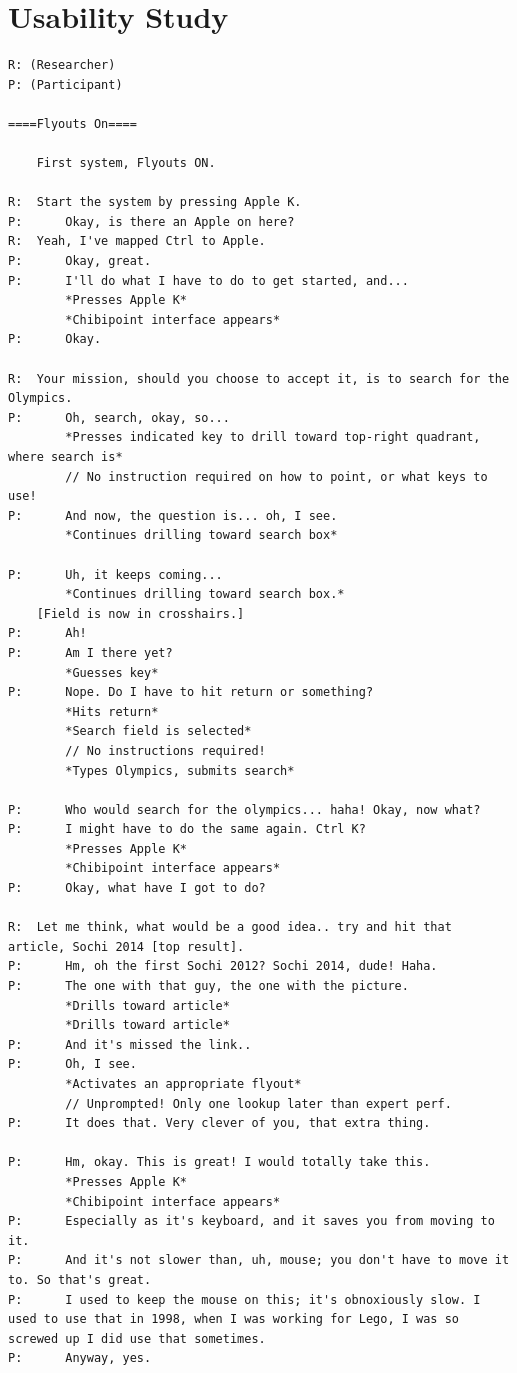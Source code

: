 \documentclass[11pt,openright,a4paper]{report}
\begin{document}
\clearpage
{}
{}
\appendix
\chapter{Usability Study}

\begin{lstlisting}[caption={Transcript of Usability Study}, label={lst:usabilityTrans}, style=basic, language=custom, flexiblecolumns=true]
R: (Researcher)
P: (Participant)

====Flyouts On====

	First system, Flyouts ON.

R:	Start the system by pressing Apple K.
P:		Okay, is there an Apple on here?
R:	Yeah, I've mapped Ctrl to Apple.
P:		Okay, great.
P:		I'll do what I have to do to get started, and...
		*Presses Apple K*
		*Chibipoint interface appears*
P:		Okay.

R:	Your mission, should you choose to accept it, is to search for the Olympics.
P:		Oh, search, okay, so...
		*Presses indicated key to drill toward top-right quadrant, where search is*
		// No instruction required on how to point, or what keys to use!
P:		And now, the question is... oh, I see.
		*Continues drilling toward search box*

P:		Uh, it keeps coming...
		*Continues drilling toward search box.*
	[Field is now in crosshairs.]
P:		Ah!
P:		Am I there yet?
		*Guesses key*
P:		Nope. Do I have to hit return or something?
		*Hits return*
		*Search field is selected*
		// No instructions required!
		*Types Olympics, submits search*

P:		Who would search for the olympics... haha! Okay, now what?
P:		I might have to do the same again. Ctrl K?
		*Presses Apple K*
		*Chibipoint interface appears*
P:		Okay, what have I got to do?

R:	Let me think, what would be a good idea.. try and hit that article, Sochi 2014 [top result].
P:		Hm, oh the first Sochi 2012? Sochi 2014, dude! Haha.
P:		The one with that guy, the one with the picture.
		*Drills toward article*
		*Drills toward article*
P:		And it's missed the link..
P:		Oh, I see.
		*Activates an appropriate flyout*
		// Unprompted! Only one lookup later than expert perf.
P:		It does that. Very clever of you, that extra thing.

P:		Hm, okay. This is great! I would totally take this.
		*Presses Apple K*
		*Chibipoint interface appears*
P:		Especially as it's keyboard, and it saves you from moving to it.
P:		And it's not slower than, uh, mouse; you don't have to move it to. So that's great.
P:		I used to keep the mouse on this; it's obnoxiously slow. I used to use that in 1998, when I was working for Lego, I was so screwed up I did use that sometimes.
P:		Anyway, yes.


\end{lstlisting}
\end{document}
